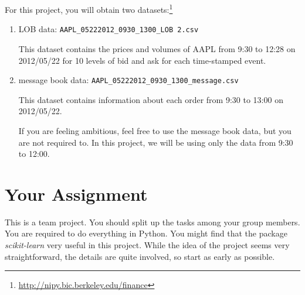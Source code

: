 \documentclass[11pt, oneside]{article}   	%
\begin{document}
For this project, you will obtain two datasets:\footnote{\url{http://nipy.bic.berkeley.edu/finance}} 
\begin{enumerate}
\item LOB data: \verb|AAPL_05222012_0930_1300_LOB 2.csv|

This dataset contains the prices and volumes of AAPL from 9:30 to 12:28 on 2012/05/22 for 10 levels of bid and ask for each time-stamped event.

\item message book data: \verb|AAPL_05222012_0930_1300_message.csv|

This dataset contains information about each order from 9:30 to 13:00 on 2012/05/22.

If you are feeling ambitious, feel free to use the message book data, but you are not required to. In this project, we will be using only the data from 9:30 to 12:00.

\end{enumerate}

\section{Your Assignment}

This is a team project. You should split up the tasks among your group members. You are required to do everything in Python. You might find that the package \textit{scikit-learn} very useful in this project. While the idea of the project seems very straightforward, the details are quite involved, so start as early as possible.
\end{document}

